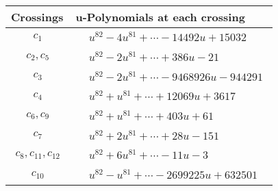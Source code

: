 \documentclass[1p]{elsarticle_modified}
\theoremstyle{definition}
\begin{document}
\begin{tabular}{m{50pt}|m{274pt}}
Crossings & \hspace{64pt}u-Polynomials at each crossing \\
\hline $$\begin{aligned}c_{1}\end{aligned}$$&$\begin{aligned}
&u^{82}-4 u^{81}+\cdots-14492 u+15032
\end{aligned}$\\
\hline $$\begin{aligned}c_{2},c_{5}\end{aligned}$$&$\begin{aligned}
&u^{82}-2 u^{81}+\cdots+386 u-21
\end{aligned}$\\
\hline $$\begin{aligned}c_{3}\end{aligned}$$&$\begin{aligned}
&u^{82}-2 u^{81}+\cdots-9468926 u-944291
\end{aligned}$\\
\hline $$\begin{aligned}c_{4}\end{aligned}$$&$\begin{aligned}
&u^{82}+u^{81}+\cdots+12069 u+3617
\end{aligned}$\\
\hline $$\begin{aligned}c_{6},c_{9}\end{aligned}$$&$\begin{aligned}
&u^{82}+u^{81}+\cdots+403 u+61
\end{aligned}$\\
\hline $$\begin{aligned}c_{7}\end{aligned}$$&$\begin{aligned}
&u^{82}+2 u^{81}+\cdots+28 u-151
\end{aligned}$\\
\hline $$\begin{aligned}c_{8},c_{11},c_{12}\end{aligned}$$&$\begin{aligned}
&u^{82}+6 u^{81}+\cdots-11 u-3
\end{aligned}$\\
\hline $$\begin{aligned}c_{10}\end{aligned}$$&$\begin{aligned}
&u^{82}- u^{81}+\cdots-2699225 u+632501
\end{aligned}$\\
\hline
\end{tabular}\\~\\
\end{document}
